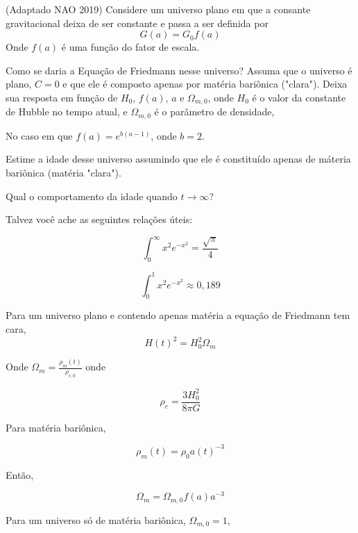 \documentclass[11pt]{article}
\begin{document}
\begin{pproblem}(Adaptado NAO 2019) Considere um universo plano em que a consante gravitacional deixa de ser constante e passa a ser definida por
    \[G(a) = G_0 f(a)\]
    Onde \(f(a)\) é uma função do fator de escala.
    \begin{alternativas}
        \item Como se daria a Equação de Friedmann nesse universo? Assuma que o universo é plano, \(C = 0\) e que ele é composto apenas por matéria bariônica ("clara"). Deixa sua resposta em função de \(H_0\), \(f(a)\), \(a\) e \(\Omega_{m,0}\), onde \(H_0\) é o valor da constante de Hubble no tempo atual, e \(\Omega_{m,0}\) é o parâmetro de densidade,
        
        No caso em que \(f(a) = e^{b(a-1)}\), onde \(b=2\).
        
        \item Estime a idade desse universo assumindo que ele é constituído apenas de máteria bariônica (matéria "clara").
                
        \item Qual o comportamento da idade quando \(t\rightarrow \infty\)?
    \end{alternativas}

    Talvez você ache as seguintes relações úteis:
    \begin{paracol}{2}
        \[\int_0^\infty x^2e^{-x^2} = \frac{\sqrt{\pi}}{4}\]

        \switchcolumn

        \[\int_0^1 x^2e^{-x^2} \approx 0,189\]
    \end{paracol}
\begin{pssolution*}{}{}
    \begin{alternativas}
        \item Para um universo plano e contendo apenas matéria a equação de Friedmann tem cara, 
        \[H(t)^2 = H_0^2\Omega_m\]

        Onde \(\Omega_m = \frac{\rho_m(t)}{\rho_{c, 0}}\) onde 

        \[\rho_c = \frac{3 H_0^2}{8\pi G}\]

        Para matéria bariônica, 

        \[\rho_m(t) = \rho_0a(t)^{-3}\]

        Então, 

        \[\Omega_m = \Omega_{m,0} f(a)a^{-3}\]

        Para um universo só de matéria bariônica, \(\Omega_{m,0} = 1\),
        

\end{alternativas}
\end{pssolution*}
\end{pproblem}
\end{document}
